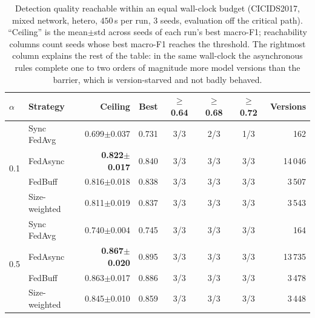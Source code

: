 \begin{table}[t]\centering
\caption{Detection quality reachable within an equal wall-clock budget
(CICIDS2017, mixed network, hetero, $450$\,s per run, 3 seeds, evaluation off
the critical path). ``Ceiling'' is the mean$\pm$std across seeds of each run's
best macro-F1; reachability columns count seeds whose best macro-F1 reaches
the threshold. The rightmost column explains the rest of the table: in the
same wall-clock the asynchronous rules complete one to two orders of magnitude
more model versions than the barrier, which is version-starved and not badly
behaved.}
\label{tab:sweep}
\begin{tabular}{ll rr ccc r}
\toprule
$\alpha$ & Strategy & Ceiling & Best & $\geq$0.64 & $\geq$0.68 & $\geq$0.72 & Versions \\
\midrule
\multirow{4}{*}{0.1}
 & Sync FedAvg & 0.699$\pm$0.037 & 0.731 & 3/3 & 2/3 & 1/3 & 162 \\
 & FedAsync & \textbf{0.822$\pm$0.017} & 0.840 & 3/3 & 3/3 & 3/3 & 14\,046 \\
 & FedBuff & 0.816$\pm$0.018 & 0.838 & 3/3 & 3/3 & 3/3 & 3\,507 \\
 & Size-weighted & 0.811$\pm$0.019 & 0.837 & 3/3 & 3/3 & 3/3 & 3\,543 \\
\midrule
\multirow{4}{*}{0.5}
 & Sync FedAvg & 0.740$\pm$0.004 & 0.745 & 3/3 & 3/3 & 3/3 & 164 \\
 & FedAsync & \textbf{0.867$\pm$0.020} & 0.895 & 3/3 & 3/3 & 3/3 & 13\,735 \\
 & FedBuff & 0.863$\pm$0.017 & 0.886 & 3/3 & 3/3 & 3/3 & 3\,478 \\
 & Size-weighted & 0.845$\pm$0.010 & 0.859 & 3/3 & 3/3 & 3/3 & 3\,448 \\
\bottomrule
\end{tabular}
\end{table}
